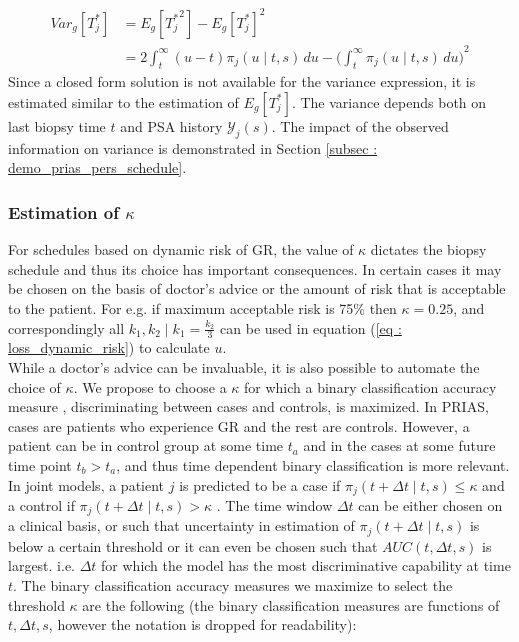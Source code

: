 \begin{equation}
\begin{split}
Var_g[T^*_j] &= E_g[{T^*_j}^2] - {E_g[T^*_j]}^2\\
&= 2 \int_t^\infty {(u-t) \pi_j(u \mid t, s) \,du} - {\bigg(\int_t^\infty \pi_j(u \mid t, s) \,du\bigg)}^2
\end{split}
\end{equation}
Since a closed form solution is not available for the variance expression, it is estimated similar to the estimation of $E_g[T^*_j]$. The variance depends both on last biopsy time $t$ and PSA history $\mathcal{Y}_j(s)$. The impact of the observed information on variance is demonstrated in Section \ref{subsec : demo_prias_pers_schedule}.

\subsubsection{Estimation of $\kappa$}
\label{subsubsec : kappa_estimation}
For schedules based on dynamic risk of GR, the value of $\kappa$ dictates the biopsy schedule and thus its choice has important consequences. In certain cases it may be chosen on the basis of doctor's advice or the amount of risk that is acceptable to the patient. For e.g. if maximum acceptable risk is 75\% then $\kappa = 0.25$, and correspondingly all $k_1, k_2 \mid k_1=\frac{k_2}{3}$ can be used in equation (\ref{eq : loss_dynamic_risk}) to calculate $u$.\\

While a doctor's advice can be invaluable, it is also possible to automate the choice of $\kappa$. We propose to choose a $\kappa$ for which a binary classification accuracy measure \citep{lopez2014optimalcutpoints,sokolova2009systematic}, discriminating between cases and controls, is maximized. In PRIAS, cases are patients who experience GR and the rest are controls. However, a patient can be in control group at some time $t_a$ and in the cases at some future time point $t_b > t_a$, and thus time dependent binary classification is more relevant. In joint models, a patient $j$ is predicted to be a case if $\pi_j(t + \Delta t \mid t,s) \leq \kappa$ and a control if $\pi_j(t + \Delta t \mid t,s) > \kappa$ \citep{rizopoulosJMbayes}. The time window $\Delta t$ can be either chosen on a clinical basis, or such that uncertainty in estimation of $\pi_j(t + \Delta t \mid t,s)$ is below a certain threshold or it can even be chosen such that $AUC(t, \Delta t, s)$ \citep{rizopoulosJMbayes} is largest. i.e. $\Delta t$ for which the model has the most discriminative capability at time $t$. The binary classification accuracy measures we maximize to select the threshold $\kappa$ are the following (the binary classification measures are functions of $t, \Delta t, s$, however the notation is dropped for readability): 

